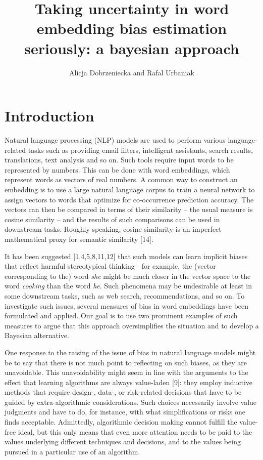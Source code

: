 \documentclass[
  10pt,
  dvipsnames,enabledeprecatedfontcommands]{scrartcl}
\title{Taking uncertainty in word embedding bias estimation seriously: a
bayesian approach}
\author{Alicja Dobrzeniecka and Rafal Urbaniak}
\date{}
\begin{document}
\maketitle

\hypertarget{introduction}{%
\section{Introduction}\label{introduction}}

Natural language processing (NLP) models are used to perform various
language-related tasks such as providing email filters, intelligent
assistants, search results, translations, text analysis and so on. Such
tools require input words to be represented by numbers. This can be done
with word embeddings, which represent words as vectors of real numbers.
A common way to construct an embedding is to use a large natural
language corpus to train a neural network to assign vectors to words
that optimize for co-occurrence prediction accuracy. The vectors can
then be compared in terms of their similarity -- the usual measure is
cosine similarity -- and the results of such comparisons can be used in
downstream tasks. Roughly speaking, cosine similarity is an imperfect
mathematical proxy for semantic similarity {[}14{]}.

It has been suggested {[}1,4,5,8,11,12{]} that such models can learn
implicit biases that reflect harmful stereotypical thinking---for
example, the (vector corresponding to the) word \textit{she} might be
much closer in the vector space to the word \textit{cooking} than the
word \textit{he}. Such phenomena may be undesirable at least in some
downstream tasks, such as web search, recommendations, and so on. To
investigate such issues, several measures of bias in word embeddings
have been formulated and applied. Our goal is to use two prominent
examples of such measures to argue that this approach oversimplifies the
situation and to develop a Bayesian alternative.

One response to the raising of the issue of bias in natural language
models might be to say that there is not much point to reflecting on
such biases, as they are unavoidable. This unavoidability might seem in
line with the arguments to the effect that learning algorithms are
always value-laden {[}9{]}: they employ inductive methods that require
design-, data-, or risk-related decisions that have to be guided by
extra-algorithmic considerations. Such choices necessarily involve value
judgments and have to do, for instance, with what simplifications or
risks one finds acceptable. Admittedly, algorithmic decision making
cannot fulfill the value-free ideal, but this only means that even more
attention needs to be paid to the values underlying different techniques
and decisions, and to the values being pursued in a particular use of an
algorithm.
\end{document}
